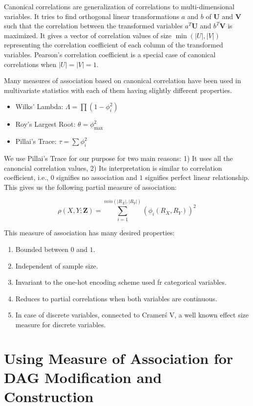 \documentclass[letterpaper]{article} %
\begin{document}
Canonical correlations are generalization of correlations to multi-dimensional
variables. It tries to find orthogonal linear transformations $ a $ and $ b $
of $ \bm{U} $ and $ \bm{V} $ such that the correlation between the transformed
variables $ a^T \bm{U} $ and $ b^T \bm{V} $ is maximized. It gives a vector of
correlation values of size $ \min(\rvert U \rvert, \rvert V \rvert) $
representing the correlation coefficient of each column of the transformed
variables. Pearson's correlation coefficient is a special case of canonical
correlations when $ \rvert U \rvert = \rvert V \rvert = 1$.

Many measures of association based on canonical correlation have been used in
multivariate statistics with each of them having slightly different properties.
\begin{itemize}
	\item Wilks' Lambda: $ \Lambda = \prod (1 - \phi_i^2) $
	\item Roy's Largest Root: $ \theta = \phi_{\max}^2 $
	\item Pillai's Trace: $ \tau = \sum \phi_i^2 $
\end{itemize}

We use Pillai's Trace for our purpose for two main reasons: 1) It uses all the
canoncial correlation values, 2) Its interpretation is similar to correlation
coefficient, i.e., $ 0 $ signifies no association and $ 1 $ signifies perfect
linear relationship. This gives us the following partial measure of association:

$$ \rho(X, Y; \bm{Z}) = \sum_{i=1}^{min(\rvert R_X \rvert, \rvert R_Y \rvert)} (\phi_i(R_X, R_Y))^2 $$


This measure of association has many desired properties:

\begin{enumerate}
	\item Bounded between $ 0 $ and $ 1 $.
	\item Independent of sample size.
	\item Invariant to the one-hot encoding scheme used fr categorical variables.
	\item Reduces to partial correlations when both variables are continuous.
	\item In case of discrete variables, connected to Cramer\'s V, a well
		known effect size measure for discrete variables.
\end{enumerate}

\section{Using Measure of Association for DAG Modification and Construction}
\label{sec:modification}
\end{document}
